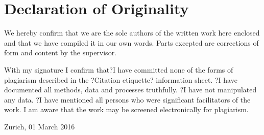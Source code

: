 \chapter{Declaration of Originality}

We hereby confirm that we are the sole authors of the written work here enclosed and that we have compiled it in our own words. Parts excepted are corrections of form and content by the supervisor.

With my signature I confirm that?I have committed none of the forms of plagiarism described in the ?Citation etiquette? information sheet.
?I have documented all methods, data and processes truthfully.
?I have not manipulated any data.
?I have mentioned all persons who were significant facilitators of the work.
I am aware that the work may be screened electronically for plagiarism.

Zurich, 01 March 2016